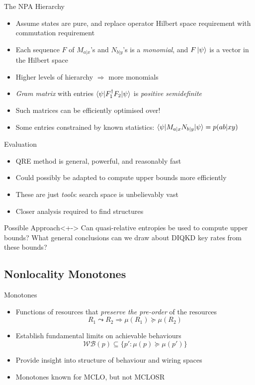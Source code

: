 \documentclass[xcolor=dvipsnames]{beamer}
\newcommand{\?}{\mathrel{?}} %
\newcommand{\sWB}{\mathcal{WB}}
\begin{document}
\begin{frame}{The NPA Hierarchy}
  \begin{itemize}[<+->]
    \item Assume states are pure, and replace operator Hilbert space requirement with commutation requirement
    \item Each sequence \(F\) of \(M_{a|x}\)'s and \(N_{b|y}\)'s is a \emph{monomial}, and \(F\ket{\psi}\) is a vector in the Hilbert space
    \item Higher levels of hierarchy \(\Rightarrow\) more monomials
    \item \emph{Gram matrix} with entries \(\braket{\psi|F_1^{\dagger}F_2|\psi}\) is \emph{positive semidefinite}
    \item Such matrices \alert{can be efficiently optimised over!}
    \item Some entries constrained by known statistics: \(\braket{\psi|M_{a|x}N_{b|y}|\psi} = p(ab|xy)\)
  \end{itemize}
\end{frame}

\begin{frame}{Evaluation}
  \begin{itemize}[<+->]
    \item QRE method is general, powerful, and reasonably fast
    \item Could possibly be adapted to compute upper bounds more efficiently
    \item These are just \emph{tools}: search space is unbelievably vast
    \item Closer analysis required to find structures
  \end{itemize}
  \begin{block}{Possible Approach}<+->
    Can quasi-relative entropies be used to compute upper bounds? What general conclusions can we draw about DIQKD key rates from these bounds?
  \end{block}
\end{frame}

\subsection{Nonlocality Monotones}

\begin{frame}{Monotones}
  \begin{itemize}[<+->]
    \item Functions of resources that \emph{preserve the pre-order} of the resources
      \[ R_1 \leadsto R_2 \Rightarrow \mu(R_1) \succeq \mu(R_2) \]
    \item Establish fundamental limits on achievable behaviours
      \[ \sWB(p) \subseteq \{ p' : \mu(p) \succeq \mu(p') \} \]
    \item Provide insight into structure of behaviour and wiring spaces
    \item Monotones known for MCLO, but not MCLOSR
  \end{itemize}
\end{frame}
\end{document}
